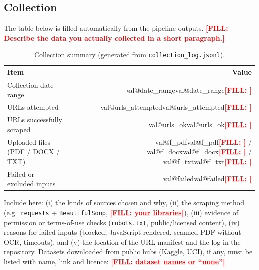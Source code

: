 \documentclass[11pt,a4paper]{article}
\makeatletter
\newcommand{\todo}[1]{\textcolor{red}{\textbf{[FILL: #1]}}}
\newcommand{\val}[1]{\ifcsname val@#1\endcsname\csname val@#1\endcsname\else\todo{\detokenize{#1}}\fi}
\makeatother
\begin{document}
\subsection{Collection}
The table below is filled automatically from the pipeline outputs. \todo{Describe the data you actually collected in a short paragraph.}

\begin{table}[H]
\centering
\caption{Collection summary (generated from \texttt{collection\_log.jsonl}).}
\begin{tabular}{p{6cm}r}
\toprule
\textbf{Item} & \textbf{Value} \\
\midrule
Collection date range & \val{date_range} \\
URLs attempted & \val{urls_attempted} \\
URLs successfully scraped & \val{urls_ok} \\
Uploaded files (PDF / DOCX / TXT) & \val{f_pdf} / \val{f_docx} / \val{f_txt} \\
Failed or excluded inputs & \val{failed} \\
\bottomrule
\end{tabular}
\end{table}

Include here: (i) the kinds of sources chosen and why, (ii) the scraping method (e.g.\ \texttt{requests} + \texttt{BeautifulSoup}, \todo{your libraries}), (iii) evidence of permission or terms-of-use checks (\texttt{robots.txt}, public/licensed content), (iv) reasons for failed inputs (blocked, JavaScript-rendered, scanned PDF without OCR, timeouts), and (v) the location of the URL manifest and the log in the repository. Datasets downloaded from public hubs (Kaggle, UCI), if any, must be listed with name, link and licence: \todo{dataset names or ``none''}.
\end{document}

